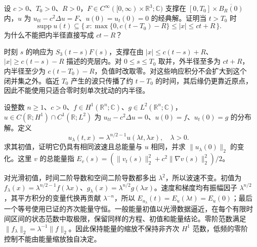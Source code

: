 \begin{exercise}\label{b2:ex:11-forcing-shell}
设 \(c>0\)、\(T_0>0\)、\(R>0\)，\(F\in C^\infty([0,\infty)\times\mathbb R^3;\mathbb C)\) 支撑在 \([0,T_0]\times\overline{B_R(0)}\) 内，\(u\) 为 \(u_{tt}-c^2\Delta u=F\)、\(u(0)=u_t(0)=0\) 的经典解。证明当 \(t>T_0\) 时
\[
 \operatorname{supp}u(t)\subseteq
 \{\,x:\max\{0,c(t-T_0)-R\}\leq|x|\leq ct+R\,\}.
\]
为什么不能把内半径直接写成 \(ct-R\)？
\end{exercise}
\begin{solution}
时刻 \(s\) 的响应为 \(S_3(t-s)F(s)\)，支撑在由 \(|x|\leq c(t-s)+R\)、\(|x|\geq c(t-s)-R\) 描述的壳层内。对 \(0\leq s\leq T_0\) 取并，外半径至多为 \(ct+R\)，内半径至少为 \(c(t-T_0)-R\)，负值时改取零。对这些响应积分不会扩大到这个闭并集之外。临近 \(T_0\) 产生的波只传播了约 \(t-T_0\) 的时间，其后缘仍更靠近原点，因此不能使用只适合零时刻单次扰动的内半径。
\end{solution}

\begin{exercise}\label{b2:ex:11-energy-scaling}
设整数 \(n\geq1\)、\(c>0\)、\(f\in H^1(\mathbb R^n;\mathbb C)\)、\(g\in L^2(\mathbb R^n;\mathbb C)\)，\(u\in C(\mathbb R;H^1)\cap C^1(\mathbb R;L^2)\) 为 \(u_{tt}-c^2\Delta u=0\)、\(u(0)=f\)、\(u_t(0)=g\) 的分布解。定义
\[
 u_\lambda(t,x)=\lambda^{n/2-1}u(\lambda t,\lambda x),\quad\lambda>0.
\]
求其初值，证明它仍具有相同波速且总能量与 \(u\) 相同，并求 \(\|u_\lambda(0)\|_2\) 的变化。这里 \(v\) 的总能量指 \(E_v(s)=(\|v_t(s)\|_2^2+c^2\|\nabla v(s)\|_2^2)/2\)。
\end{exercise}
\begin{solution}
对光滑初值，时间二阶导数和空间二阶导数都多出 \(\lambda^2\)，所以波速不变。初值为 \(f_\lambda(x)=\lambda^{n/2-1}f(\lambda x)\)、\(g_\lambda(x)=\lambda^{n/2}g(\lambda x)\)。速度和梯度均有振幅因子 \(\lambda^{n/2}\)，其平方积分的变量代换再贡献 \(\lambda^{-n}\)，所以 \(E_{u_\lambda}(t)=E_u(\lambda t)=E_u(0)\)；最后一个等号使用已证的齐次能量守恒。一般能量初值以光滑数据逼近，在每个有限时间区间的状态范数中取极限，保留同样的方程、初值和能量结论。零阶范数满足 \(\|f_\lambda\|_2=\lambda^{-1}\|f\|_2\)。因此保持能量的缩放不保持非齐次 \(H^1\) 范数，低频的零阶控制不能由能量缩放独自决定。
\end{solution}

